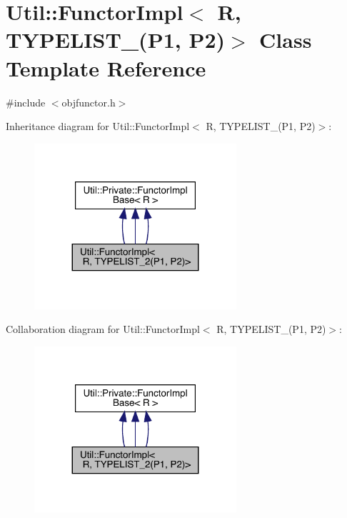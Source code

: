 \hypertarget{classUtil_1_1FunctorImpl_3_01R_00_01TYPELIST__2_07P1_00_01P2_08_4}{}\section{Util\+:\+:Functor\+Impl$<$ R, T\+Y\+P\+E\+L\+I\+S\+T\+\_(P1, P2)$>$ Class Template Reference}
\label{classUtil_1_1FunctorImpl_3_01R_00_01TYPELIST__2_07P1_00_01P2_08_4}


{\ttfamily \#include $<$objfunctor.\+h$>$}



Inheritance diagram for Util\+:\+:Functor\+Impl$<$ R, T\+Y\+P\+E\+L\+I\+S\+T\+\_(P1, P2)$>$\+:
\nopagebreak
\begin{figure}[H]
\begin{center}
\leavevmode
\includegraphics[width=212pt]{d5/d1b/classUtil_1_1FunctorImpl_3_01R_00_01TYPELIST__2_07P1_00_01P2_08_4__inherit__graph}
\end{center}
\end{figure}


Collaboration diagram for Util\+:\+:Functor\+Impl$<$ R, T\+Y\+P\+E\+L\+I\+S\+T\+\_(P1, P2)$>$\+:
\nopagebreak
\begin{figure}[H]
\begin{center}
\leavevmode
\includegraphics[width=212pt]{d9/dd2/classUtil_1_1FunctorImpl_3_01R_00_01TYPELIST__2_07P1_00_01P2_08_4__coll__graph}
\end{center}
\end{figure}
